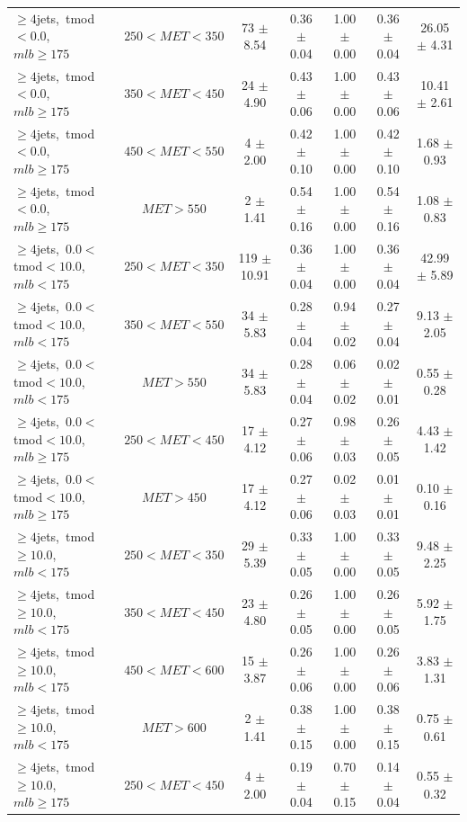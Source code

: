 \begin{table}
\begin{tabular}{|l|c|c|c|c|c|c|}
\hline
 $\ge4$jets,~tmod$<0.0$,~$mlb\ge175$ & $250<MET<350$  & 73 $\pm$ 8.54  & 0.36 $\pm$ 0.04  & 1.00 $\pm$ 0.00 & 0.36 $\pm$ 0.04  & 26.05 $\pm$ 4.31  \\
 $\ge4$jets,~tmod$<0.0$,~$mlb\ge175$ & $350<MET<450$  & 24 $\pm$ 4.90  & 0.43 $\pm$ 0.06  & 1.00 $\pm$ 0.00 & 0.43 $\pm$ 0.06  & 10.41 $\pm$ 2.61  \\
 $\ge4$jets,~tmod$<0.0$,~$mlb\ge175$ & $450<MET<550$  & 4 $\pm$ 2.00  & 0.42 $\pm$ 0.10  & 1.00 $\pm$ 0.00 & 0.42 $\pm$ 0.10  & 1.68 $\pm$ 0.93  \\
 $\ge4$jets,~tmod$<0.0$,~$mlb\ge175$ & $MET>550$  & 2 $\pm$ 1.41  & 0.54 $\pm$ 0.16  & 1.00 $\pm$ 0.00 & 0.54 $\pm$ 0.16  & 1.08 $\pm$ 0.83  \\
\hline
 $\ge4$jets,~$0.0<$tmod$<10.0$,~$mlb<175$ & $250<MET<350$  & 119 $\pm$ 10.91  & 0.36 $\pm$ 0.04  & 1.00 $\pm$ 0.00 & 0.36 $\pm$ 0.04  & 42.99 $\pm$ 5.89  \\
 $\ge4$jets,~$0.0<$tmod$<10.0$,~$mlb<175$ & $350<MET<550$  & 34 $\pm$ 5.83  & 0.28 $\pm$ 0.04  & 0.94 $\pm$ 0.02 & 0.27 $\pm$ 0.04  & 9.13 $\pm$ 2.05  \\
 $\ge4$jets,~$0.0<$tmod$<10.0$,~$mlb<175$ & $MET>550$  & 34 $\pm$ 5.83  & 0.28 $\pm$ 0.04  & 0.06 $\pm$ 0.02 & 0.02 $\pm$ 0.01  & 0.55 $\pm$ 0.28  \\
\hline
 $\ge4$jets,~$0.0<$tmod$<10.0$,~$mlb\ge175$ & $250<MET<450$  & 17 $\pm$ 4.12  & 0.27 $\pm$ 0.06  & 0.98 $\pm$ 0.03 & 0.26 $\pm$ 0.05  & 4.43 $\pm$ 1.42  \\
 $\ge4$jets,~$0.0<$tmod$<10.0$,~$mlb\ge175$ & $MET>450$  & 17 $\pm$ 4.12  & 0.27 $\pm$ 0.06  & 0.02 $\pm$ 0.03 & 0.01 $\pm$ 0.01  & 0.10 $\pm$ 0.16  \\
\hline
 $\ge4$jets,~tmod$\ge10.0$,~$mlb<175$ & $250<MET<350$  & 29 $\pm$ 5.39  & 0.33 $\pm$ 0.05  & 1.00 $\pm$ 0.00 & 0.33 $\pm$ 0.05  & 9.48 $\pm$ 2.25  \\
 $\ge4$jets,~tmod$\ge10.0$,~$mlb<175$ & $350<MET<450$  & 23 $\pm$ 4.80  & 0.26 $\pm$ 0.05  & 1.00 $\pm$ 0.00 & 0.26 $\pm$ 0.05  & 5.92 $\pm$ 1.75  \\
 $\ge4$jets,~tmod$\ge10.0$,~$mlb<175$ & $450<MET<600$  & 15 $\pm$ 3.87  & 0.26 $\pm$ 0.06  & 1.00 $\pm$ 0.00 & 0.26 $\pm$ 0.06  & 3.83 $\pm$ 1.31  \\
 $\ge4$jets,~tmod$\ge10.0$,~$mlb<175$ & $MET>600$  & 2 $\pm$ 1.41  & 0.38 $\pm$ 0.15  & 1.00 $\pm$ 0.00 & 0.38 $\pm$ 0.15  & 0.75 $\pm$ 0.61  \\
\hline
 $\ge4$jets,~tmod$\ge10.0$,~$mlb\ge175$ & $250<MET<450$  & 4 $\pm$ 2.00  & 0.19 $\pm$ 0.04  & 0.70 $\pm$ 0.15 & 0.14 $\pm$ 0.04  & 0.55 $\pm$ 0.32  \\

\end{tabular}
\end{table}
